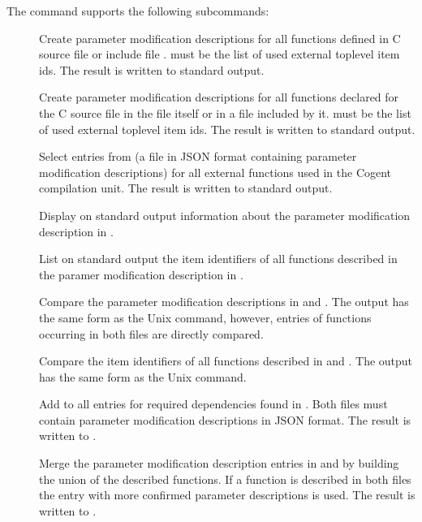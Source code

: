 The  command supports the following subcommands:
\begin{description}
\item[] Create parameter modification descriptions for all functions defined in C source file 
or include file .  must be the list of used external toplevel item ids. 
The result is written to standard output.

\item[] Create parameter modification descriptions for all functions declared for the C source file
 in the file itself or in a file included by it.  must be the list of used external toplevel item ids. 
The result is written to standard output.

\item[] Select entries from  (a file in JSON format containing parameter modification
descriptions) for all external functions used in the Cogent compilation unit. 
The result is written to standard output.

\item[] Display on standard output information about the parameter modification description in .

\item[] List on standard output the item identifiers of all functions described in the 
paramer modification description in .

\item[] Compare the parameter modification descriptions in  and . The output
has the same form as the Unix  command, however, entries of functions occurring in both files are 
directly compared.

\item[] Compare the item identifiers of all functions described in  and .
The output has the same form as the Unix  command.

\item[] Add to  all entries for required dependencies found in . Both files must contain 
parameter modification descriptions in JSON format. The result is written to .

\item[] Merge the parameter modification description entries in  and  by building 
the union of the described functions. If a function is described in both files the entry with more confirmed parameter 
descriptions is used. The result is written to .


\end{description}
